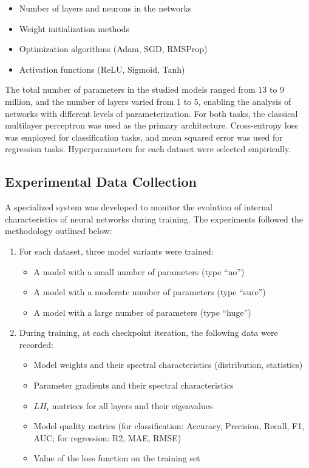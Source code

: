 \documentclass[a4paper,12pt]{article}
\begin{document}
\begin{itemize}
  \item Number of layers and neurons in the networks
  \item Weight initialization methods
  \item Optimization algorithms (Adam, SGD, RMSProp)
  \item Activation functions (ReLU, Sigmoid, Tanh)
\end{itemize}

The total number of parameters in the studied models ranged from 13 to 9 million, and the number of layers
varied from 1 to 5, enabling the analysis of networks with different levels of parameterization. For both
tasks, the classical multilayer perceptron was used as the primary architecture. Cross-entropy loss was
employed for classification tasks, and mean squared error was used for regression tasks. Hyperparameters for
each dataset were selected empirically.

\subsection{Experimental Data Collection}

A specialized system was developed to monitor the evolution of internal characteristics of neural networks
during training. The experiments followed the methodology outlined below:

\begin{enumerate}
  \item For each dataset, three model variants were trained:
    \begin{itemize}
      \item A model with a small number of parameters (type ``no'')
      \item A model with a moderate number of parameters (type ``sure'')
      \item A model with a large number of parameters (type ``huge'')
    \end{itemize}

  \item During training, at each checkpoint iteration, the following data were recorded:
    \begin{itemize}
      \item Model weights and their spectral characteristics (distribution, statistics)
      \item Parameter gradients and their spectral characteristics
      \item $LH_i$ matrices for all layers and their eigenvalues
      \item Model quality metrics (for classification: Accuracy, Precision, Recall, F1, AUC; for regression:
        R2, MAE, RMSE)
      \item Value of the loss function on the training set
    \end{itemize}
\end{enumerate}
\end{document}
